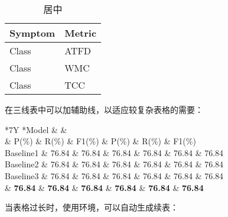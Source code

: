\begin{texcode}[]{}
  \begin{table}[H]
    \caption{居中}
    \begin{tabularx}{\textwidth}{YY}
    \toprule
        \textbf{Symptom} & \textbf{Metric} \\
    \midrule
        Class  & ATFD \\
        Class  & WMC \\
        Class  & TCC \\
    \bottomrule
    \end{tabularx}
  \end{table}
\end{texcode}


\clearpage


在三线表中可以加辅助线，以适应较复杂表格的需要：

\begin{texcode}[]{}
\begin{table}[H]  
  \centering
  \caption{compare with other approachs}
  \label{table:methodcompare}
  \begin{tabularx}{\textwidth}{*{7}Y}
    \toprule
    *{Model} &  &   \\ 
    & P(\%) & R(\%) & F1(\%) & P(\%) & R(\%) & F1(\%) \\
    \midrule 
    Baseline1 & 76.84 & 76.84 & 76.84 & 76.84 & 76.84 & 76.84 \\
    \midrule[0.5pt]
    Baseline2  & 76.84 & 76.84 & 76.84 & 76.84 & 76.84 & 76.84 \\
    Baseline3  & 76.84 & 76.84 & 76.84 & 76.84 & 76.84 & 76.84 \\
      & {\bf 76.84} & {\bf 76.84} & {\bf 76.84} & {\bf 76.84} & {\bf 76.84} & {\bf 76.84} \\
    \bottomrule
  \end{tabularx}
\end{table}
\end{texcode}

\clearpage


当表格过长时，使用环境，可以自动生成续表：

